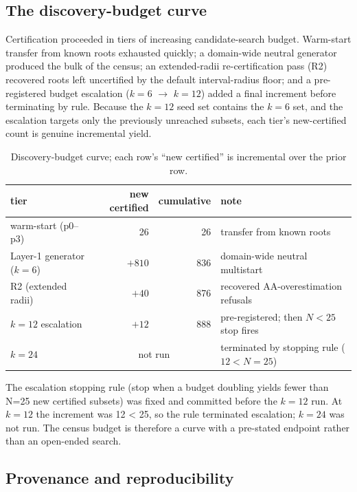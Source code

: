 \documentclass[pdflatex,sn-mathphys-num]{sn-jnl}
\begin{document}
\subsection{The discovery-budget curve}\label{sec:5.2}

Certification proceeded in tiers of increasing candidate-search budget. Warm-start transfer from known roots exhausted quickly; a domain-wide neutral generator produced the bulk of the census; an extended-radii re-certification pass (R2) recovered roots left uncertified by the default interval-radius floor; and a pre-registered budget escalation ($k{=}6$ $\to$ $k{=}12$) added a final increment before terminating by rule. Because the $k{=}12$ seed set contains the $k{=}6$ set, and the escalation targets only the previously unreached subsets, each tier's new-certified count is genuine incremental yield.

\begin{table}[htbp]
\centering
\caption{Discovery-budget curve; each row's ``new certified'' is incremental over the prior row.}
\label{tab:curve}
\scriptsize
\begin{tabular}{p{2.7cm}rr>{\raggedright\arraybackslash}p{3.2cm}}\hline
tier & new certified & cumulative & note \\\hline
warm-start (p0--p3) & 26 & 26 & transfer from known roots \\
Layer-1 generator ($k{=}6$) & $+810$ & 836 & domain-wide neutral multistart \\
R2 (extended radii) & $+40$ & 876 & recovered AA-overestimation refusals \\
$k{=}12$ escalation & $+12$ & 888 & pre-registered; then $N<25$ stop fires \\\hline
$k{=}24$ & \multicolumn{2}{c}{not run} & terminated by stopping rule ($12<N{=}25$) \\\hline
\end{tabular}
\end{table}

The escalation stopping rule (stop when a budget doubling yields fewer than N=25 new certified subsets) was fixed and committed before the $k{=}12$ run. At $k{=}12$ the increment was 12 < 25, so the rule terminated escalation; $k{=}24$ was not run. The census budget is therefore a curve with a pre-stated endpoint rather than an open-ended search.

\subsection{Provenance and reproducibility}\label{sec:5.3}
\end{document}
